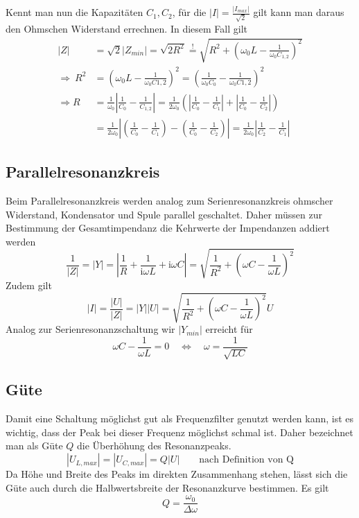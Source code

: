 Kennt man nun die Kapazitäten $ C_1, C_2 $, für die $ |I| = \frac{|I_{max}|}{\sqrt{2}} $ gilt kann man daraus den Ohmschen Widerstand errechnen. In diesem Fall gilt \begin{align}
	|Z| &= \sqrt 2 |Z_{min}| = \sqrt{2 R^2} \stackrel{!}{=} \sqrt{R^2 + \left(\omega_0 L - \frac{1}{\omega_0 C_{1,2}}\right)^2} \\
	\Rightarrow~ R^2 &= \left(\omega_0 L - \frac{1}{\omega_0 C{1,2}}\right)^2 = \left(\frac{1}{\omega_0C_0} - \frac{1}{\omega_0 C{1,2}}\right)^2 \\
	\Rightarrow R &= \frac{1}{\omega_0} \left|\frac{1}{C_0} - \frac{1}{C_{1,2}}\right|
		= \frac{1}{2\omega_0} \left(\left|\frac{1}{C_0} - \frac{1}{C_1}\right| + \left|\frac{1}{C_0} - \frac{1}{C_2}\right|\right) \\
		&= \frac{1}{2\omega_0} \left|\left(\frac{1}{C_0} - \frac{1}{C_1}\right) - \left(\frac{1}{C_0} - \frac{1}{C_2}\right)\right| 
		= \frac{1}{2\omega_0} \left|\frac{1}{C_2} - \frac{1}{C_1}\right|
\end{align}

\subsection{Parallelresonanzkreis}
Beim Parallelresonanzkreis werden analog zum Serienresonanzkreis ohmscher Widerstand, Kondensator und Spule parallel geschaltet. Daher müssen zur Bestimmung der Gesamtimpendanz die Kehrwerte der Impendanzen addiert werden \begin{equation}
	\frac{1}{|Z|} = |Y| = \left|\frac{1}{R} + \frac{1}{\mathrm i \omega L} + \mathrm i \omega C\right| = \sqrt{\frac{1}{R^2} + \left(\omega C - \frac{1}{\omega L}\right)^2}
\end{equation}
Zudem gilt \begin{equation}
	|I| = \frac{|U|}{|Z|} = |Y||U| = \sqrt{\frac{1}{R^2} + \left(\omega C - \frac{1}{\omega L}\right)^2} U
\end{equation}
Analog zur Serienresonanzschaltung wir $ |Y_{min}| $ erreicht für \begin{equation}
	\omega C - \frac{1}{\omega L} = 0 \quad \Leftrightarrow \quad \omega = \frac{1}{\sqrt{LC}}
\end{equation}
\subsection{Güte}
Damit eine Schaltung möglichst gut als Frequenzfilter genutzt werden kann, ist es wichtig, dass der Peak bei dieser Frequenz möglichst schmal ist. Daher bezeichnet man als Güte $ Q $ die Überhöhung des Resonanzpeaks. \begin{equation}
	|U_{L,max}| = |U_{C,max}| = Q|U| \qquad \text{nach Definition von Q}
\end{equation}
Da Höhe und Breite des Peaks im direkten Zusammenhang stehen, lässt sich die Güte auch durch die Halbwertsbreite der Resonanzkurve bestimmen. Es gilt
\begin{equation}
	Q = \frac{\omega_0}{\Delta \omega}
\end{equation}
